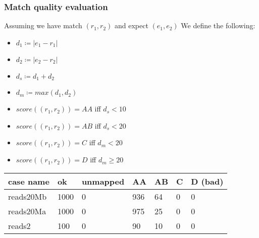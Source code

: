 \documentclass{beamer}
\begin{document}
\begin{frame}
  \frametitle{Match quality evaluation}

  Assuming we have match $(r_1, r_2)$ and expect $(e_1, e_2)$
  We define the following:

  \begin{itemize}
    \item $d_1 \coloneqq |e_1 - r_1|$
    \item $d_2 \coloneqq |e_2 - r_2|$
    \item $d_s \coloneqq d_1 + d_2$
    \item $d_m \coloneqq max(d_1, d_2)$
  \end{itemize}

  \begin{itemize}
    \item $score((r_1, r_2)) = AA$ iff $d_s < 10$
    \item $score((r_1, r_2)) = AB$ iff $d_s < 20$
    \item $score((r_1, r_2)) = C$ iff $d_m < 20$
    \item $score((r_1, r_2)) = D$ iff $d_m \geq 20$
  \end{itemize}

  
  \begin{table}[]
    \begin{tabular}{|l|l|l|l|l|l|l|}
    \hline
    case name                        & ok                          & unmapped                 & AA                         & AB                        & C                        & D (bad)                  \\ \hline
    \rowcolor[HTML]{333333} 
    {\color[HTML]{FFFFFF} reads20Mb} & {\color[HTML]{FFFFFF} 1000} & {\color[HTML]{FFFFFF} 0} & {\color[HTML]{FFFFFF} 936} & {\color[HTML]{FFFFFF} 64} & {\color[HTML]{FFFFFF} 0} & {\color[HTML]{FFFFFF} 0} \\ \hline
    \rowcolor[HTML]{FFFFFF} 
    {\color[HTML]{333333} reads20Ma} & {\color[HTML]{333333} 1000} & {\color[HTML]{333333} 0} & {\color[HTML]{333333} 975} & {\color[HTML]{333333} 25} & {\color[HTML]{333333} 0} & {\color[HTML]{333333} 0} \\ \hline
    \rowcolor[HTML]{333333} 
    {\color[HTML]{DAE8FC} reads2}    & {\color[HTML]{DAE8FC} 100}  & {\color[HTML]{DAE8FC} 0} & {\color[HTML]{DAE8FC} 90}  & {\color[HTML]{DAE8FC} 10} & {\color[HTML]{DAE8FC} 0} & {\color[HTML]{DAE8FC} 0} \\ \hline
    \end{tabular}
  
  \end{table}

\end{frame}
\end{document}
